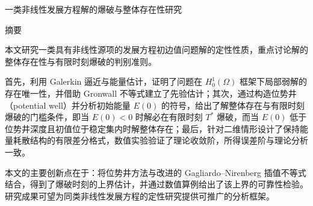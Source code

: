 \documentclass[12pt,a4paper,twoside,openright]{ctexbook}
\newcommand{\thesisTitleC}{一类非线性发展方程解的爆破与整体存在性研究} %
\numberwithin{figure}{chapter}
\numberwithin{table}{chapter}
\numberwithin{equation}{chapter}
\theoremstyle{ncwuthm}
\begin{document}
\vspace{1.0cm}

\vspace{\fill}
\clearpage

\setcounter{page}{1}

\begin{center}
  {\heiti\thesisTitleC\par}
  \vspace{0.8cm}
  {\heiti 摘\hspace{0.6em}要\par}
\end{center}
\vspace{0.4cm}

\songti
本文研究一类具有非线性源项的发展方程初边值问题解的定性性质，重点讨论解的整体存在性与有限时刻爆破的判别准则。\par

首先，利用 Galerkin 逼近与能量估计，证明了问题在 $H^1_0(\Omega)$ 框架下局部弱解的存在唯一性，并借助 Gronwall 不等式建立了先验估计；其次，通过构造位势井（potential well）并分析初始能量 $E(0)$ 的符号，给出了解整体存在与有限时刻爆破的门槛条件，即当 $E(0)<0$ 时解必在有限时刻 $T^*$ 爆破，而当 $E(0)$ 低于位势井深度且初值位于稳定集内时解整体存在；最后，针对二维情形设计了保持能量耗散结构的有限差分格式，数值实验验证了理论收敛阶，所得误差阶与理论分析一致。\par

本文的主要创新点在于：将位势井方法与改进的 Gagliardo--Nirenberg 插值不等式结合，得到了爆破时刻的上界估计，并通过数值算例给出了该上界的可靠性检验。研究成果可望为同类非线性发展方程的定性研究提供可推广的分析框架。\par
\end{document}
